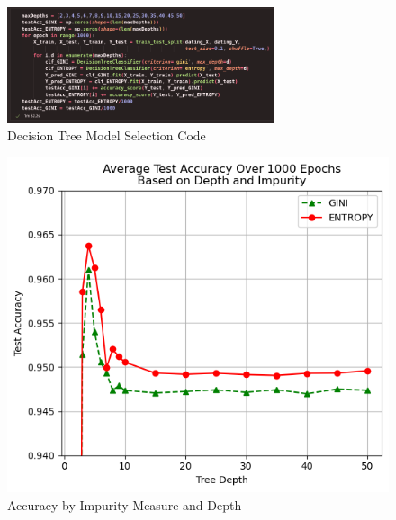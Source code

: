 \documentclass{article}
\begin{document}
    \begin{figure}[H]
        \centering
        \includegraphics[width=0.7\textwidth, height=0.18\textheight]{tree_selection_code.png}
        \caption{\small{Decision Tree Model Selection Code}}
    \end{figure}
    \begin{figure}[H]
        \centering
        \begin{minipage}[t]{0.49\textwidth}
            \centering
            \includegraphics[width=\textwidth, height=0.25\textheight]{tree_selection1.png}
            \caption{\small{Accuracy by Impurity Measure and Depth}}
        \end{minipage}
        \hfill
        \begin{minipage}[t]{0.49\textwidth}
            \centering

\end{minipage}
\end{figure}
\end{document}
